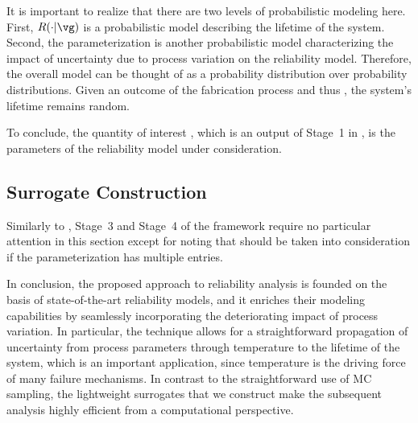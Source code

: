 \begin{remark} 
It is important to realize that there are two levels of probabilistic modeling
here. First, $R(\cdot | \vg)$ \perse is a probabilistic model describing the
lifetime \life of the system. Second, the parameterization \vg is another
probabilistic model characterizing the impact of uncertainty due to process
variation on the reliability model. Therefore, the overall model can be thought
of as a probability distribution over probability distributions. Given an
outcome of the fabrication process and thus \vg, the system's lifetime remains
random.
\end{remark}

To conclude, the quantity of interest \g, which is an output of Stage~1 in
, is the parameters \vg of the reliability model under
consideration.

\subsection{Surrogate Construction}

Similarly to , Stage~3 and Stage~4 of the
framework require no particular attention in this section except for noting that
 should be taken into consideration if the
parameterization \vg has multiple entries.

\conclusioncut
In conclusion, the proposed approach to reliability analysis is founded on the
basis of state-of-the-art reliability models, and it enriches their modeling
capabilities by seamlessly incorporating the deteriorating impact of process
variation. In particular, the technique allows for a straightforward propagation
of uncertainty from process parameters through temperature to the lifetime of
the system, which is an important application, since temperature is the driving
force of many failure mechanisms. In contrast to the straightforward use of
\ac{MC} sampling, the lightweight surrogates that we construct make the
subsequent analysis highly efficient from a computational perspective.

